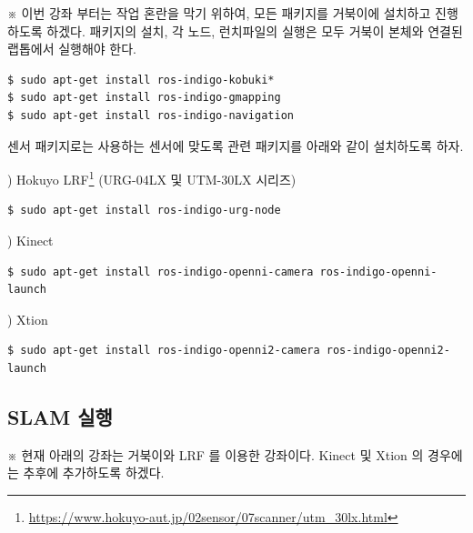 ※ 이번 강좌 부터는 작업 혼란을 막기 위하여, 모든 패키지를 거북이에 설치하고 진행하도록 하겠다. 패키지의 설치, 각 노드, 런치파일의 실행은 모두 거북이 본체와 연결된 랩톱에서 실행해야 한다.

\vspace{\baselineskip}
\begin{lstlisting}[language=ROS]
$ sudo apt-get install ros-indigo-kobuki*
$ sudo apt-get install ros-indigo-gmapping
$ sudo apt-get install ros-indigo-navigation
\end{lstlisting}

센서 패키지로는 사용하는 센서에 맞도록 관련 패키지를 아래와 같이 설치하도록 하자.

\setcounter{num}{0}

\vspace{\baselineskip}
\noindent
{}
\thenum) Hokuyo LRF\footnote{\url{https://www.hokuyo-aut.jp/02sensor/07scanner/utm_30lx.html}} (URG-04LX 및 UTM-30LX 시리즈)

\vspace{\baselineskip}
\begin{lstlisting}[language=ROS]
$ sudo apt-get install ros-indigo-urg-node
\end{lstlisting}
 
\vspace{\baselineskip}
\noindent
{}
\thenum) Kinect

\vspace{\baselineskip}
\begin{lstlisting}[language=ROS]
$ sudo apt-get install ros-indigo-openni-camera ros-indigo-openni-launch
\end{lstlisting}


\vspace{\baselineskip}
\noindent
{}
\thenum) Xtion

\vspace{\baselineskip}
\begin{lstlisting}[language=ROS]
$ sudo apt-get install ros-indigo-openni2-camera ros-indigo-openni2-launch
\end{lstlisting}


\subsection{SLAM 실행}

※ 현재 아래의 강좌는 거북이와 LRF 를 이용한 강좌이다. Kinect 및 Xtion 의 경우에는 추후에 추가하도록 하겠다.


